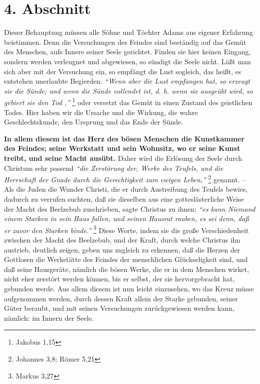 \section{4. Abschnitt} \label{kap3_ab4} 

Dieser Behauptung müssen alle Söhne und Töchter Adams aus eigener Erfahrung
beistimmen. Denn die Versuchungen des Feindes sind beständig auf das Gemüt des
Menschen, aufs Innere seiner Seele gerichtet. Finden sie hier keinen Eingang,
sondern werden verleugnet und abgewiesen, so sündigt die Seele nicht. Läßt man
sich aber mit der Versuchung ein, so empfängt die Lust sogleich, das heißt, es
entstehen unerlaubte Begierden.
\textit{"`Wenn aber die Lust empfangen hat, so erzeugt
sie die Sünde; und wenn die Sünde vollendet ist, d. h. wenn sie ausgeübt wird,
so gebiert sie den Tod ,"'}
\footnote{Jakobus 1,15}
oder versetzt das Gemüt in einen
Zustand des geistlichen Todes. Hier haben wir die
Ursache und die Wirkung, die
wahre Geschlechtskunde, den Ursprung und das Ende der Sünde.

\medskip

\textbf{In allem diesem ist das Herz des bösen Menschen die Kunstkammer des
Feindes; seine Werkstatt und sein Wohnsitz, wo er seine Kunst treibt, und seine
Macht ausübt.} Daher wird die Erlösung der Seele durch Christum sehr passend
\textit{"`die Zerstörung der, Werke des Teufels, und die Herrschaft der Gnade
durch die Gerechtigkeit zum ewigen Leben,"'}
\footnote{Johannes 3,8; Römer 5,21}
genannt. -- Als
die Juden die Wunder Christi, die er durch Austreibung des Teufels bewies,
dadurch zu verrufen suchten, daß sie dieselben aus eine gotteslästerliche Weise
der Macht des Beelzebub zuschrieben, sagte Christus zu ihnen:
\textit{"`es kann Niemand einem Starken in sein Haus fallen, und seinen
Hausrat rauben, es sei denn, daß er zuvor den Starken binde."'}
\footnote{Markus 3,27}
Diese Worte, indem sie die
große Verschiedenheit zwischen der Macht des Beelzebub, und der Kraft, durch
welche Christus ihn austrieb, deutlich zeigen, geben uns zugleich zu erkennen,
daß die Herzen der Gottlosen die Werkstätte des Feindes der menschlichen
Glückseligkeit sind, und daß seine Hausgeräte, nämlich die bösen Werke, die er
in dem Menschen wirket, nicht eher zerstört werden können, bis er selbst, der
sie hervorgebracht hat, gebunden werde. Aus allem diesem ist nun leicht
einzusehen, wo das Kreuz müsse aufgenommen werden, durch dessen Kraft allein der
Starke gebunden, seiner Güter beraubt, und mit seinen Versuchungen
zurückgewiesen werden kann, nämlich: im Innern der Seele.

